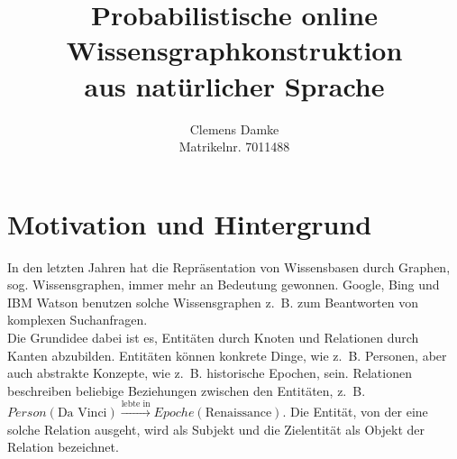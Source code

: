 \documentclass[11pt, a4paper]{scrreprt}
\begin{document}
\titlehead{Entwurf 3}
\subject{Bachelorarbeit Proposal}
\title{
	Probabilistische online\\
	Wissensgraphkonstruktion\\
	aus natürlicher Sprache
}
\author{
	Clemens Damke\\[1ex]
	Matrikelnr. 7011488
}
\publishers{
	{\normalsize betreut von}\\[2ex]
	Prof.~Dr.~Eyke Hüllermeier\\
	Intelligente Systeme\\
	Institut für Informatik\\
	Universität Paderborn
}
\maketitle

\section{Motivation und Hintergrund}

In den letzten Jahren hat die Repräsentation von Wissensbasen durch Graphen, sog. Wissensgraphen, immer mehr an Bedeutung gewonnen.
Google, Bing und IBM Watson benutzen solche Wissensgraphen z.~B. zum Beantworten von komplexen Suchanfragen.\\

Die Grundidee dabei ist es, Entitäten durch Knoten und Relationen durch Kanten abzubilden.
Entitäten können konkrete Dinge, wie z.~B. Personen, aber auch abstrakte Konzepte, wie z.~B. historische Epochen, sein.
Relationen beschreiben beliebige Beziehungen zwischen den Entitäten, z.~B. $Person(\text{Da~Vinci}) \xrightarrow{\text{lebte~in}} Epoche(\text{Renaissance})$.
Die Entität, von der eine solche Relation ausgeht, wird als Subjekt und die Zielentität als Objekt der Relation bezeichnet.\\
\end{document}

